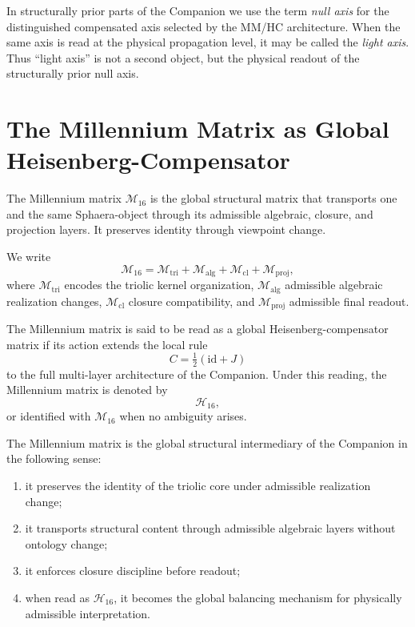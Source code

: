 \begin{remark}
In structurally prior parts of the Companion we use the term \emph{null axis}
for the distinguished compensated axis selected by the MM/HC architecture.
When the same axis is read at the physical propagation level, it may be called
the \emph{light axis}. Thus ``light axis'' is not a second object, but the
physical readout of the structurally prior null axis.
\end{remark}

\section{The Millennium Matrix as Global Heisenberg-Compensator}
\label{sec:millennium-hc}

\begin{definition}
The Millennium matrix $\mathcal M_{16}$ is the global structural matrix that
transports one and the same Sphaera-object through its admissible algebraic,
closure, and projection layers. It preserves identity through viewpoint
change.
\end{definition}

\begin{definition}
We write
\[
\mathcal M_{16}
=
\mathcal M_{\mathrm{tri}}
+
\mathcal M_{\mathrm{alg}}
+
\mathcal M_{\mathrm{cl}}
+
\mathcal M_{\mathrm{proj}},
\]
where $\mathcal M_{\mathrm{tri}}$ encodes the triolic kernel organization,
$\mathcal M_{\mathrm{alg}}$ admissible algebraic realization changes,
$\mathcal M_{\mathrm{cl}}$ closure compatibility, and
$\mathcal M_{\mathrm{proj}}$ admissible final readout.
\end{definition}

\begin{definition}
The Millennium matrix is said to be read as a global Heisenberg-compensator
matrix if its action extends the local rule
\[
C=\tfrac12(\mathrm{id}+J)
\]
to the full multi-layer architecture of the Companion. Under this reading, the
Millennium matrix is denoted by
\[
\mathcal H_{16},
\]
or identified with $\mathcal M_{16}$ when no ambiguity arises.
\end{definition}

\begin{theorem}
\label{thm:mm-role}
The Millennium matrix is the global structural intermediary of the Companion in
the following sense:
\begin{enumerate}
  \item it preserves the identity of the triolic core under admissible
  realization change;
  \item it transports structural content through admissible algebraic layers
  without ontology change;
  \item it enforces closure discipline before readout;
  \item when read as $\mathcal H_{16}$, it becomes the global balancing
  mechanism for physically admissible interpretation.
\end{enumerate}
\end{theorem}


